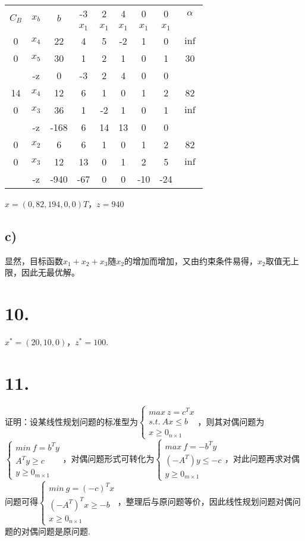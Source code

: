 \documentclass{article}
\begin{document}
	
	\begin{tabular}{|c|c|c|ccccc|c|}
		\hline
		\multirow{2}{*}{$C_B$} & \multirow{2}{*}{$x_b$} & \multirow{2}{*}{$b$} &-3&2&4&0&0 & $\alpha$ \\
		\cline{4-8}
		&   & & $x_1$ & $x_1$ & $x_1$ & $x_1$ & $x_1$ & \\
		\hline
		0 & $x_4$ & 22 & 4&5&-2&1&0&$\inf$\\
		0 & $x_5$ & 30 & 1&2&1&0&1&30\\
		
		\hline
		& -z & 0 & -3&2&4&0&0 & \\
		\hline
		14 & $x_4$ & 12 &6&1&0&1&2&82\\
		0 & $x_3$ & 36 &1&-2&1&0&1&$\inf$\\
		
		\hline
		& -z & -168 & 6&14&13&0&0 & \\
		\hline
		0 & $x_2$ & 6 &6&1&0&1&2&82\\
		0 & $x_3$ & 12 & 13&0&1&2&5&$\inf$\\
		
		\hline
		& -z & -940 & -67&0&0&-10&-24 & \\
		
		
		\hline
	\end{tabular}
	
	$x=(0,82,194,0,0)T$，$z=940$
	
	
	\subsection*{c)}
	
	显然，目标函数$x_1+x_2+x_3$随$x_2$的增加而增加，又由约束条件易得，$x_2$取值无上限，因此无最优解。
	\section*{10.}
	
	$x^*=(20,10,0)$，$z^*=100$.
	
	\section*{11.}
	
	证明：设某线性规划问题的标准型为$\begin{cases} max \ z=c^Tx\\ s.t. \ Ax\leq b\\ x\geq 0_{n\times 1} \end{cases}$，则其对偶问题为$\begin{cases} min\ f=b^Ty\\ A^Ty\geq c\\ y\geq0_{m\times 1} \end{cases}$，对偶问题形式可转化为$\begin{cases} max\ f=-b^Ty\\ (-A^T)y\leq -c\\ y\geq0_{m\times 1} \end{cases}$，对此问题再求对偶问题可得$\begin{cases} min\ g=(-c)^Tx\\ (-A^T)^Tx\geq -b\\ x\geq0_{n\times 1} \end{cases}$，整理后与原问题等价，因此线性规划问题对偶问题的对偶问题是原问题.
	
\end{document}
